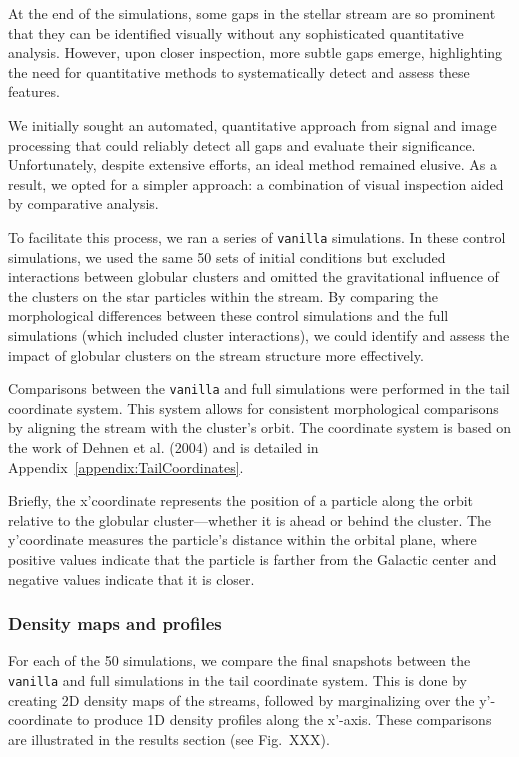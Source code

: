 \documentclass[]{aa}
\begin{document}
    At the end of the simulations, some gaps in the stellar stream are so prominent that they can be identified visually without any sophisticated quantitative analysis. However, upon closer inspection, more subtle gaps emerge, highlighting the need for quantitative methods to systematically detect and assess these features.

    We initially sought an automated, quantitative approach from signal and image processing that could reliably detect all gaps and evaluate their significance. Unfortunately, despite extensive efforts, an ideal method remained elusive. As a result, we opted for a simpler approach: a combination of visual inspection aided by comparative analysis.

    To facilitate this process, we ran a series of \texttt{vanilla} simulations. In these control simulations, we used the same 50 sets of initial conditions but excluded interactions between globular clusters and omitted the gravitational influence of the clusters on the star particles within the stream. By comparing the morphological differences between these control simulations and the full simulations (which included cluster interactions), we could identify and assess the impact of globular clusters on the stream structure more effectively.


    Comparisons between the \texttt{vanilla} and full simulations  were performed in the tail coordinate system. This system allows for consistent morphological comparisons by aligning the stream with the cluster's orbit. The coordinate system is based on the work of Dehnen et al. (2004) and is detailed in Appendix~\ref{appendix:TailCoordinates}.

    Briefly, the x'coordinate represents the position of a particle along the orbit relative to the globular cluster—whether it is ahead or behind the cluster. The y'coordinate measures the particle's distance within the orbital plane, where positive values indicate that the particle is farther from the Galactic center and negative values indicate that it is closer.

    \subsubsection*{Density maps and profiles}
      For each of the 50 simulations, we compare the final snapshots between the \texttt{vanilla} and full simulations in the tail coordinate system. This is done by creating 2D density maps of the streams, followed by marginalizing over the y'-coordinate to produce 1D density profiles along the x'-axis. These comparisons are illustrated in the results section (see Fig.~XXX).
\end{document}
